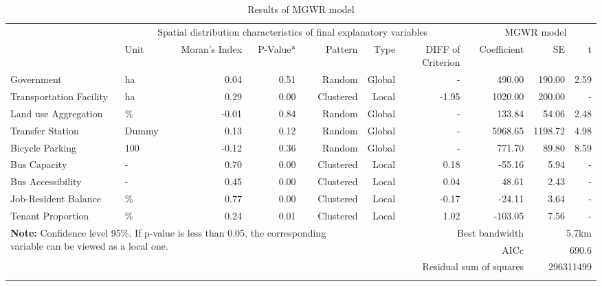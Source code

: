 \begin{sidewaystable}[htbp]
	\centering
	\caption{Results of MGWR model}
	\label{tab:chp3:ResultMGWR}
	\small
	\renewcommand{\arraystretch}{1.25} %
	
	\begin{tabular}{llrrrrrrrrr}
		\Xhline{1.5pt}
		\multicolumn{1}{l}{\multirow{2}[4]{*}{Variable}} & \multicolumn{6}{c}{Spatial distribution characteristics of final explanatory variables} & & \multicolumn{3}{c}{MGWR model} \\
		
		\cmidrule{2-7}\cmidrule{9-11}
		
		& \multicolumn{1}{p{3em}}{Unit} & \multicolumn{1}{p{4em}}{Moran's Index} & P-Value* & Pattern & Type & \multicolumn{1}{p{4em}}{DIFF of Criterion} & & Coefficient & SE & t \\
		
		\cmidrule{1-7}\cmidrule{9-11}
		
		Government & ha & 0.04 & 0.51 & Random & Global &- & & 490.00 & 190.00 & 2.59 \\
		Transportation Facility & ha & 0.29 & 0.00 & Clustered & Local & -1.95 & & 1020.00 & 200.00 & - \\
		Land use Aggregation & \% & -0.01 & 0.84 & Random & Global & - & & 133.84 & 54.06 & 2.48 \\
		Transfer Station & Dummy & 0.13 & 0.12 & Random & Global & - & & 5968.65 & 1198.72 & 4.98 \\
		Bicycle Parking & 100 & -0.12 & 0.36 & Random & Global & - & & 771.70 & 89.80 & 8.59 \\
		Bus Capacity & - & 0.70 & 0.00 & Clustered & Local & 0.18  & & -55.16 & 5.94  & - \\
		Bus Accessibility & - & 0.45 & 0.00 &  Clustered & Local & 0.04 & & 48.61 & 2.43 & - \\
		Job-Resident Balance & \% & 0.77 & 0.00 & Clustered & Local & -0.17 & & -24.11 & 3.64 & - \\
		Tenant Proportion & \% & 0.24 & 0.01 & Clustered & Local & 1.02 & & -103.05 & 7.56 & - \\
		
		\midrule
		
		\multicolumn{5}{l}{\multirow{3}[2]{30em}{\textbf{Note:} Confidence level 95\%. If p-value is less than 0.05, the corresponding variable can be viewed as a local one.}} & \multicolumn{4}{r}{Best bandwidth} & \multicolumn{2}{r}{5.7km} \\
		\multicolumn{5}{l}{} & \multicolumn{4}{r}{AICc} & \multicolumn{2}{r}{690.6} \\
		\multicolumn{5}{l}{} & \multicolumn{4}{r}{Residual sum of squares} & \multicolumn{2}{r}{296311499} \\
		
		\Xhline{1.5pt}
	\end{tabular}%
\end{sidewaystable}%


